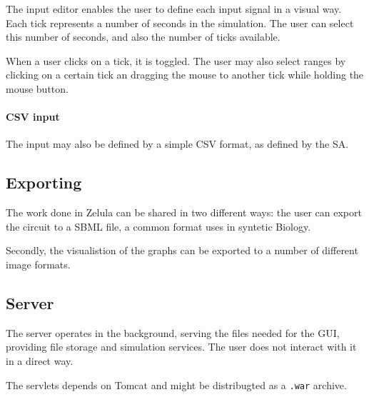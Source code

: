 \noindent The input editor enables the user to define each input signal in a visual way. Each tick represents a number of seconds in the simulation. The user can select this number of seconds, and also the number of ticks available.

When a user clicks on a tick, it is toggled. The user may also select ranges by clicking on a certain tick an dragging the mouse to another tick while holding the mouse button.

\paragraph{CSV input}
\begin{figure}[h!]
\centering{}
\end{figure}

\noindent The input may also be defined by a simple CSV format, as defined by the SA.

\subsection{Exporting}
The work done in Zelula can be shared in two different ways: the user can export the circuit to a SBML file, a common format uses in syntetic Biology.

Secondly, the visualistion of the graphs can be exported to a number of different image formats.

\subsection{Server}
The server operates in the background, serving the files needed for the GUI, providing file storage and simulation services. The user does not interact with it in a direct way.

The servlets depends on Tomcat and might be distribugted as a \verb|.war| archive. 
